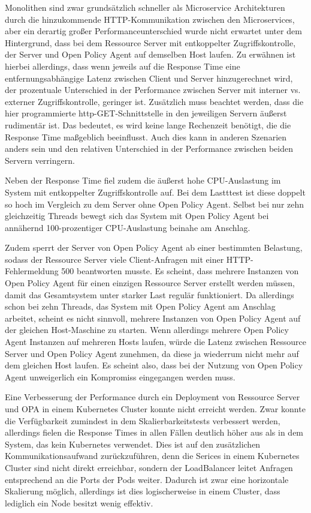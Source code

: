 Monolithen sind zwar grundsätzlich schneller als Microservice Architekturen durch die hinzukommende HTTP-Kommunikation zwischen den Microservices, aber ein derartig großer Performanceunterschied wurde nicht erwartet unter dem Hintergrund, dass bei dem Ressource Server mit entkoppelter Zugriffskontrolle, der Server und Open Policy Agent auf demselben Host laufen. Zu erwähnen ist hierbei allerdings, dass wenn jeweils auf die Response Time eine entfernungsabhängige Latenz zwischen Client und Server hinzugerechnet wird, der prozentuale Unterschied in der Performance zwischen Server mit interner vs. externer Zugriffskontrolle, geringer ist. Zusätzlich muss beachtet werden, dass die hier programmierte http-GET-Schnittstelle in den jeweiligen Servern äußerst rudimentär ist. Das bedeutet, es wird keine lange Rechenzeit benötigt, die die Response Time maßgeblich beeinflusst. Auch dies kann in anderen Szenarien anders sein und den relativen Unterschied in der Performance zwischen beiden Servern verringern.\smallskip

Neben der Response Time fiel zudem die äußerst hohe CPU-Auslastung im System mit entkoppelter Zugriffskontrolle auf. Bei dem Lastttest ist diese doppelt so hoch im Vergleich zu dem Server ohne Open Policy Agent. Selbst bei nur zehn gleichzeitig Threads bewegt sich das System mit Open Policy Agent bei annähernd 100-prozentiger CPU-Auslastung beinahe am Anschlag.\smallskip

Zudem sperrt der Server von Open Policy Agent ab einer bestimmten Belastung, sodass der Ressource Server viele Client-Anfragen mit einer HTTP-Fehlermeldung 500 beantworten musste. Es scheint, dass mehrere Instanzen von Open Policy Agent für einen einzigen Ressource Server erstellt werden müssen, damit das Gesamtsystem unter starker Last regulär funktioniert. Da allerdings schon bei zehn Threads, das System mit Open Policy Agent am Anschlag arbeitet, scheint es nicht sinnvoll, mehrere Instanzen von Open Policy Agent auf der gleichen Host-Maschine zu starten. Wenn allerdings mehrere Open Policy Agent Instanzen auf mehreren Hosts laufen, würde die Latenz zwischen Ressource Server und Open Policy Agent zunehmen, da diese ja wiederrum nicht mehr auf dem gleichen Host laufen. Es scheint also, dass bei der Nutzung von Open Policy Agent unweigerlich ein Kompromiss eingegangen werden muss.\smallskip

Eine Verbesserung der Performance durch ein Deployment von Ressource Server und OPA in einem Kubernetes Cluster konnte nicht erreicht werden. Zwar konnte die Verfügbarkeit zumindest in dem Skalierbarkeitstests verbessert werden, allerdings fielen die Response Times in allen Fällen deutlich höher aus als in dem System, das kein Kubernetes verwendet. Dies ist auf den zusätzlichen Kommunikationsaufwand zurückzuführen, denn die Serices in einem Kubernetes Cluster sind nicht direkt erreichbar, sondern der LoadBalancer leitet Anfragen entsprechend an die Ports der Pods weiter. Dadurch ist zwar eine horizontale Skalierung möglich, allerdings ist dies logischerweise in einem Cluster, dass lediglich ein Node besitzt wenig effektiv. 
